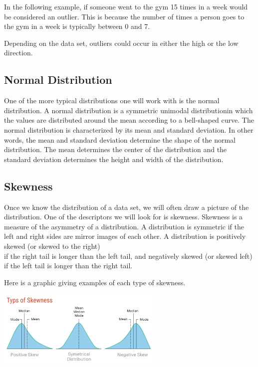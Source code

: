 \documentclass[
  letterpaper,
  DIV=11,
  numbers=noendperiod]{scrreprt}
\begin{document}
In the following example, if someone went to the gym 15 times in a week
would be considered an outlier. This is because the number of times a
person goes to the gym in a week is typically between 0 and 7.

Depending on the data set, outliers could occur in either the high or
the low direction.

\subsection*{Normal Distribution}\label{normal-distribution}

One of the more typical distributions one will work with is the normal
distribution. A normal distribution is a symmetric unimodal
distributionin which the values are distributed around the mean
according to a bell-shaped curve. The normal distribution is
characterized by its mean and standard deviation. In other words, the
mean and standard deviation determine the shape of the normal
distribution. The mean determines the center of the distribution and the
standard deviation determines the height and width of the distribution.

\subsection*{Skewness}\label{skewness}

Once we know the distribution of a data set, we will often draw a
picture of the distribution. One of the descriptors we will look for is
skewness. Skewness is a measure of the asymmetry of a distribution. A
distribution is symmetric if the left and right sides are mirror images
of each other. A distribution is positively skewed (or skewed to the
right)\\
if the right tail is longer than the left tail, and negatively skewed
(or skewed left) if the left tail is longer than the right tail.

Here is a graphic giving examples of each type of skewness.

\includegraphics[width=0.6\textwidth,height=\textheight]{./images/SL_2.jpg}
\end{document}
